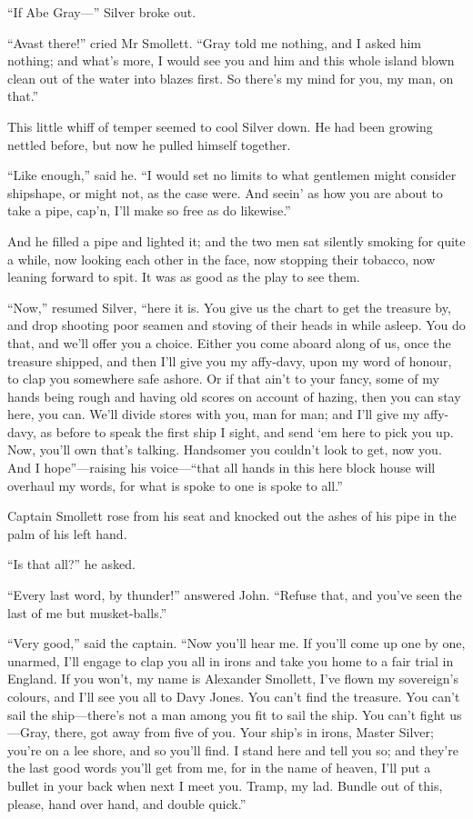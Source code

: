 \enquote{If Abe Gray---} Silver broke out.

\enquote{Avast there!} cried Mr Smollett. \enquote{Gray told me nothing, and I asked him nothing; and what’s more, I would see you and him and this whole island blown clean out of the water into blazes first. So there’s my mind for you, my man, on that.}

This little whiff of temper seemed to cool Silver down. He had been growing nettled before, but now he pulled himself together.

\enquote{Like enough,} said he. \enquote{I would set no limits to what gentlemen might consider shipshape, or might not, as the case were. And seein’ as how you are about to take a pipe, cap’n, I’ll make so free as do likewise.}

And he filled a pipe and lighted it; and the two men sat silently smoking for quite a while, now looking each other in the face, now stopping their tobacco, now leaning forward to spit. It was as good as the play to see them.

\enquote{Now,} resumed Silver, \enquote{here it is. You give us the chart to get the treasure by, and drop shooting poor seamen and stoving of their heads in while asleep. You do that, and we’ll offer you a choice. Either you come aboard along of us, once the treasure shipped, and then I’ll give you my affy-davy, upon my word of honour, to clap you somewhere safe ashore. Or if that ain’t to your fancy, some of my hands being rough and having old scores on account of hazing, then you can stay here, you can. We’ll divide stores with you, man for man; and I’ll give my affy-davy, as before to speak the first ship I sight, and send `em here to pick you up. Now, you’ll own that’s talking. Handsomer you couldn’t look to get, now you. And I hope}---raising his voice---\enquote{that all hands in this here block house will overhaul my words, for what is spoke to one is spoke to all.}

Captain Smollett rose from his seat and knocked out the ashes of his pipe in the palm of his left hand.

\enquote{Is that all?} he asked.

\enquote{Every last word, by thunder!} answered John. \enquote{Refuse that, and you’ve seen the last of me but musket-balls.}

\enquote{Very good,} said the captain. \enquote{Now you’ll hear me. If you’ll come up one by one, unarmed, I’ll engage to clap you all in irons and take you home to a fair trial in England. If you won’t, my name is Alexander Smollett, I’ve flown my sovereign’s colours, and I’ll see you all to Davy Jones. You can’t find the treasure. You can’t sail the ship---there’s not a man among you fit to sail the ship. You can’t fight us---Gray, there, got away from five of you. Your ship’s in irons, Master Silver; you’re on a lee shore, and so you’ll find. I stand here and tell you so; and they’re the last good words you’ll get from me, for in the name of heaven, I’ll put a bullet in your back when next I meet you. Tramp, my lad. Bundle out of this, please, hand over hand, and double quick.}

